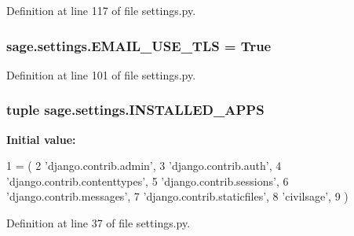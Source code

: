 Definition at line 117 of file settings.\+py.

\hypertarget{namespacesage_1_1settings_a0fe7c4174cb1b7d03f7b574ae1e5eed9}{}
\subsubsection[{E\+M\+A\+I\+L\+\_\+\+U\+S\+E\+\_\+\+T\+L\+S}]{\setlength{\rightskip}{0pt plus 5cm}sage.\+settings.\+E\+M\+A\+I\+L\+\_\+\+U\+S\+E\+\_\+\+T\+L\+S = True}\label{namespacesage_1_1settings_a0fe7c4174cb1b7d03f7b574ae1e5eed9}


Definition at line 101 of file settings.\+py.

\hypertarget{namespacesage_1_1settings_af48e999a4a4e7f8830d84ac4eb08df1a}{}
\subsubsection[{I\+N\+S\+T\+A\+L\+L\+E\+D\+\_\+\+A\+P\+P\+S}]{\setlength{\rightskip}{0pt plus 5cm}tuple sage.\+settings.\+I\+N\+S\+T\+A\+L\+L\+E\+D\+\_\+\+A\+P\+P\+S}\label{namespacesage_1_1settings_af48e999a4a4e7f8830d84ac4eb08df1a}
{\bfseries Initial value\+:}
\begin{DoxyCode}
1 = (
2     \textcolor{stringliteral}{'django.contrib.admin'},
3     \textcolor{stringliteral}{'django.contrib.auth'},
4     \textcolor{stringliteral}{'django.contrib.contenttypes'},
5     \textcolor{stringliteral}{'django.contrib.sessions'},
6     \textcolor{stringliteral}{'django.contrib.messages'},
7     \textcolor{stringliteral}{'django.contrib.staticfiles'},
8     \textcolor{stringliteral}{'civilsage'},
9 )
\end{DoxyCode}


Definition at line 37 of file settings.\+py.

\hypertarget{namespacesage_1_1settings_ac5b7a49ef37a25508ecb84453063821a}{}
